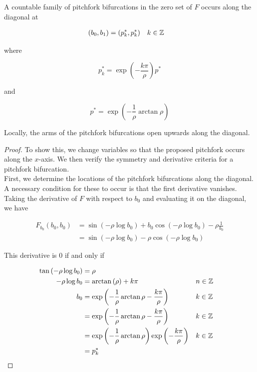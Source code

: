 \documentclass[thesis.tex]{subfiles}
\begin{document}
\begin{lemma}\label{pitchforkF}
A countable family of pitchfork bifurcations in the zero set of $F$ occurs along the diagonal at 

\begin{align*}
(b_0, b_1) &= (p_k^*, p_k^*) && k \in {\mathbb Z}
\end{align*}

where 

\begin{equation}
p^*_k = \exp\left(-\frac{k \pi}{\rho} \right) p^*
\end{equation}

and 

\begin{equation}
p^* = \exp \left( -\frac{1}{\rho} \arctan \rho \right)
\end{equation}

Locally, the arms of the pitchfork bifurcations open upwards along the diagonal.

\begin{proof}
To show this, we change variables so that the proposed pitchfork occurs along the $x$-axis. We then verify the symmetry and derivative criteria for a pitchfork bifurcation.\\

First, we determine the locations of the pitchfork bifurcations along the diagonal. A necessary condition for these to occur is that the first derivative vanishes. Taking the derivative of $F$ with respect to $b_0$ and evaluating it on the diagonal, we have

\begin{align*}
F_{b_0}(b_0, b_0) &= 
\sin \left( -\rho \log b_0 \right)
+ b_0 \cos \left( - \rho \log b_0 \right)- \rho \frac{1}{b_0} \\
&= \sin \left( - \rho \log b_0 \right) - \rho \cos \left( - \rho \log b_0 \right)
\end{align*}

This derivative is 0 if and only if

\begin{align*}
\tan \left( -\rho \log b_0 \right) &=  \rho \\
-\rho \log b_0 &= \arctan \left( \rho\right) + k \pi && n \in {\mathbb Z} \\ 
b_0 &= \exp \left( -\frac{1}{\rho} \arctan \rho - \frac{k \pi}{\rho} \right) && k \in {\mathbb Z} \\
&= \exp \left( -\frac{1}{\rho} \arctan \rho - \frac{k \pi}{\rho} \right) && k \in {\mathbb Z} \\
&= \exp \left( -\frac{1}{\rho} \arctan \rho \right) \exp \left( - \frac{k \pi}{\rho} \right) && k \in {\mathbb Z} \\
&= p_k^*
\end{align*}


\end{proof}
\end{lemma}
\end{document}
